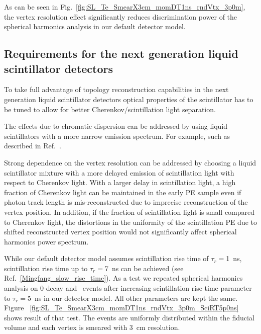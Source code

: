 As can be seen in Fig.~\ref{fig:SL_Te_SmearX3cm_momDT1ns_rndVtx_3p0m}, the vertex resolution effect significantly reduces discrimination power 
of the spherical harmonics analysis in our default detector model.



\subsection{Requirements for the next generation liquid scintillator detectors}
To take full advantage of topology reconstruction capabilities in the next generation liquid scintillator detectors optical properties of the 
scintillator has to be tuned to allow for better Cherenkov/scintillation light separation.

The effects due to chromatic dispersion can be addressed by using liquid scintillators with a more narrow emission spectrum. For example,
such as described in Ref.~\cite{LS_narrow_emission}.

Strong dependence on the vertex resolution can be addressed by choosing a liquid scintillator mixture with a more delayed emission 
of scintillation light with respect to Cherenkov light. With a larger delay in scintillation light, a high fraction of Cherenkov light 
can be maintained in the early PE sample even if photon track length is mis-reconstructed due to imprecise reconstruction of the vertex 
position. In addition, if the fraction of scintillation light is small compared to Cherenkov light, the distortions in the uniformity of 
the scintillation PE due to shifted reconstructed vertex position would not significantly affect spherical harmonics power spectrum.

While our default detector model assumes scintillation rise time of $\tau_r=$1~ns, scintillation rise time up to $\tau_r=$7~ns can 
be achieved (see Ref.~\ref{Mingfang_slow_rise_time}). As a test we repeated spherical harmonics analysis on 0\nbb-decay and \B~events after
increasing scintillation rise time parameter to $\tau_r=$5~ns in our detector model. All other parameters are kept the same.
Figure ~\ref{fig:SL_Te_SmearX3cm_momDT1ns_rndVtx_3p0m_SciRT5p0ns} shows result of that test. The events are uniformly distributed within 
the fiducial volume and each vertex is smeared with 3~cm resolution. 

